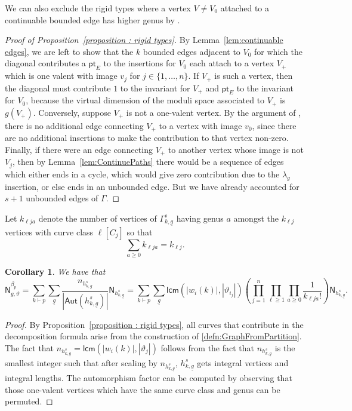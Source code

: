 \documentclass[11pt]{amsart}
\numberwithin{equation}{section}
\theoremstyle{plain}
\newtheorem{corollary}[theorem]{Corollary}
\theoremstyle{remark}
\theoremstyle{definition}
\begin{document}
We can also exclude the rigid types where a vertex $V \neq V_0$ attached to a continuable bounded edge has higher genus by \cite[Lemma 14]{bousseau2018tropical}.

\begin{proof}[Proof of Proposition~\ref{proposition : rigid types}]
  By Lemma~\ref{lem:continuable edges}, we are left to show that the $k$ bounded edges adjacent to $V_0$ for which the diagonal contributes a $\mathsf{pt}_E$ to the insertions for $V_0$ each attach to a vertex $V_+$ which is one valent with image $v_j$ for $j \in \{1,\dots, n\}$. If $V_+$ is such a vertex, then the diagonal must contribute $1$ to the invariant for $V_+$ and $\mathsf{pt}_E$ to the invariant for $V_0$, because the virtual dimension of the moduli space associated to $V_+$ is  $g(V_+)$. Conversely, suppose $V_+$ is not a one-valent vertex. By the argument of \cite[Lemma 5.8, penultimate paragraph]{bousseau2020quantumtrop}, there is no additional edge connecting $V_+$ to a vertex with image $v_0$, since there are no additional insertions to make the contribution to that vertex non-zero. Finally, if there were an edge connecting $V_+$ to another vertex whose image is not $V_j$, then by Lemma~\ref{lem:ContinuePaths} there would be a sequence of edges which either ends in a cycle, which would give zero contribution due to the $\lambda_g$ insertion, or else ends in an unbounded edge. But we have already accounted for $s+1$ unbounded edges of $\Gamma$.    
\end{proof}

Let $k_{\ell j a}$ denote the number of vertices of $\Gamma_{k,\underline{g}}^s$ having genus $a$ amongst the $k_{\ell j}$ vertices with curve class $\ell [C_j]$ so that $$\sum_{a \geq 0} k_{\ell j a } = k_{\ell j}.$$

\begin{corollary}\label{prop : decomposition}
  We have that 
    $$\mathsf{N}_{g,\vartheta}^{\beta_p} = \sum_{k \vdash p} \sum_{\underline{g}} \frac{n_{h^s_{k,\underline{g}}}}{\left|\mathsf{Aut}\left(h^s_{k,\underline{g}}\right)\right|} \mathsf{N}_{h^s_{k,\underline{g}}} =  \sum_{k \vdash p} \sum_{\underline{g}} \mathsf{lcm}\left(|w_{i}(k)|, \left|\vartheta_{i_j}\right|\right) \left(\prod_{j=1}^n \prod_{\ell \geq 1} \prod_{a \geq 0} \frac{1}{k_{\ell j a}!}\right)\mathsf{N}_{h^s_{k,\underline{g}}}.$$
\end{corollary}

\begin{proof}
  By Proposition~\ref{proposition : rigid types}, all curves that contribute in the decomposition formula arise from the construction of \eqref{defn:GraphFromPartition}. The fact that $n_{h^s_{k,\underline{g}}} = \mathsf{lcm}(|w_{i}(k)|, |\vartheta_{j}|)$ follows from the fact that $n_{h^s_{k,\underline{g}}}$ is the smallest integer such that after scaling by $n_{h^s_{k,\underline{g}}}$, $h^s_{k,\underline{g}}$ gets integral vertices and integral lengths. The automorphism factor can be computed by observing that those one-valent vertices which have the same curve class and genus can be permuted.
\end{proof}
\end{document}
